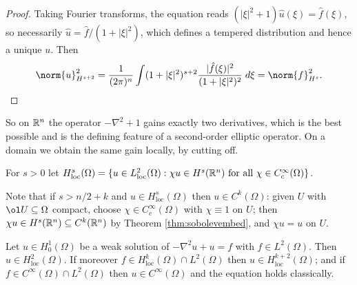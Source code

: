 \documentclass[a4paper]{scrartcl}
\begin{document}
\begin{proof}
	Taking Fourier transforms, the equation reads $(|\xi|^2+1)\hat u(\xi)=\hat f(\xi)$, so necessarily $\hat u = \hat f/(1+|\xi|^2)$, which defines a tempered distribution and hence a unique $u$. Then
	$$\norm{u}^2_{H^{s+2}}=\frac{1}{(2\pi)^n}\int(1+|\xi|^2)^{s+2}\frac{|\hat f(\xi)|^2}{(1+|\xi|^2)^2}\dd\xi=\norm{f}^2_{H^s}. \qedhere$$
\end{proof}

So on $\mathbb{R}^n$ the operator $-\nabla^2+1$ gains exactly two derivatives, which is the best possible and is the defining feature of a second-order elliptic operator. On a domain we obtain the same gain locally, by cutting off.

\begin{definition}
	For $s>0$ let $H^s_{\mathrm{loc}}(\Omega)=\{u\in L^2_{\mathrm{loc}}(\Omega) : \chi u \in H^s(\mathbb{R}^n)\text{ for all }\chi\in C_c^\infty(\Omega)\}$.
\end{definition}

Note that if $s>n/2+k$ and $u \in H^s_{\mathrm{loc}}(\Omega)$ then $u \in C^k(\Omega)$: given $U$ with $\ol U\subseteq\Omega$ compact, choose $\chi\in C_c^\infty(\Omega)$ with $\chi\equiv1$ on $U$; then $\chi u \in H^s(\mathbb{R}^n)\subseteq C^k(\mathbb{R}^n)$ by Theorem \ref{thm:sobolevembed}, and $\chi u = u$ on $U$.

\begin{theorem}\label{thm:ellipticreg}
	Let $u \in H_0^1(\Omega)$ be a weak solution of $-\nabla^2u+u=f$ with $f\in L^2(\Omega)$. Then $u \in H^2_{\mathrm{loc}}(\Omega)$. If moreover $f \in H^k_{\mathrm{loc}}(\Omega)\cap L^2(\Omega)$ then $u \in H^{k+2}_{\mathrm{loc}}(\Omega)$; and if $f \in C^\infty(\Omega)\cap L^2(\Omega)$ then $u \in C^\infty(\Omega)$ and the equation holds classically.
\end{theorem}
\end{document}
